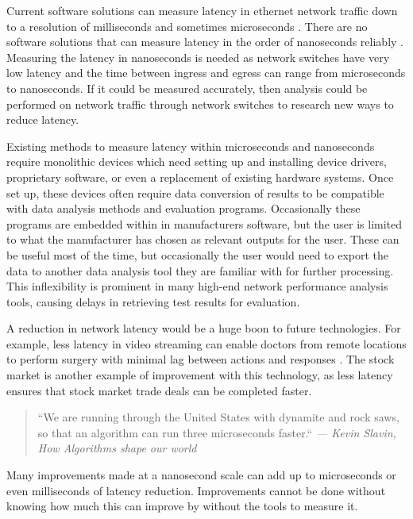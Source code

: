Current software solutions can measure latency in ethernet network traffic down to a resolution of
milliseconds and sometimes microseconds \cite{pingisbad}. There are no software solutions that can measure
latency in the order of nanoseconds reliably \cite{timeinlinux}. Measuring the latency in nanoseconds is needed as network switches have very low latency and the time between ingress and egress can range from
microseconds to nanoseconds. If it could be measured accurately, then analysis could be performed
on network traffic through network switches to research new ways to reduce latency.

Existing methods to measure latency within microseconds and nanoseconds require monolithic devices which need
setting up and installing device drivers, proprietary software, or even a replacement of existing hardware systems.
Once set up, these devices often require data conversion of results to be compatible with data analysis methods and
evaluation programs. Occasionally these programs are embedded within in manufacturers software, but the user is
limited to what the manufacturer has chosen as relevant outputs for the user. These can be useful most of the time,
but occasionally the user would need to export the data to another data analysis tool they are familiar with for
further processing. This inflexibility is prominent in many high-end network performance analysis tools, causing delays in retrieving test results for evaluation.

A reduction in network latency would be a huge boon to future technologies. For example, less
latency in video streaming can enable doctors from remote locations to perform surgery with
minimal lag between actions and responses \cite{remotesurgery}. The stock market is another example of improvement with this technology, as less latency ensures that stock market trade deals can be completed faster.

\begin{quote}
    \centering
    ``We are running through the United States with dynamite and rock saws, so that an algorithm can
    run three microseconds faster.`` \em --- Kevin Slavin, How Algorithms shape our world \cite{tedTalkAlgorithms}
\end{quote} 

\par Many improvements made at a nanosecond scale can add up to microseconds or even milliseconds of latency
reduction. Improvements cannot be done without knowing how much this can improve by without the tools to measure it.

